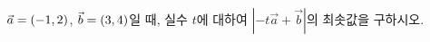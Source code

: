 $\vec{a}=(-1{,}\mkern3mu\mathopen{}2)$, $\vec{b}=(3{,}\mkern3mu\mathopen{}4)$일 때, 실수 $t$에 대하여 $|{-t}\vec{a}+\vec{b}|$의 최솟값을 구하시오.
